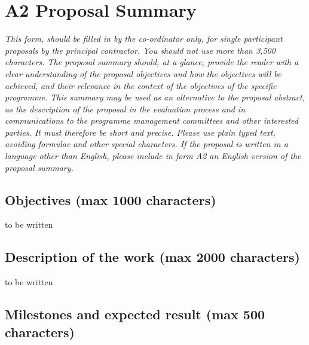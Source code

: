 \documentclass[a4paper,11pt]{report}
\begin{document}
\section*{A2 Proposal Summary}
\textit{This form, should be filled in by the co-ordinator only, for single
participant proposals by the principal contractor. You should not use more than
3,500 characters. The proposal summary should, at a glance, provide the reader
with a clear understanding of the proposal objectives and how the objectives
will be achieved, and their relevance in the context of the objectives of the
specific programme. This summary may be used as an alternative to the proposal
abstract, as the description of the proposal in the evaluation process and in
communications to the programme management committees and other interested
parties. It must therefore be short and precise. Please use plain typed text,
avoiding formulae and other special characters. If the proposal is written in a
language other than English, please include in form A2 an English version of
the proposal summary.} \\


\subsection*{Objectives (max 1000 characters)}
to be written
\subsection*{Description of the work (max 2000 characters)}
to be written
\subsection*{Milestones and expected result (max 500 characters)}
\end{document}
